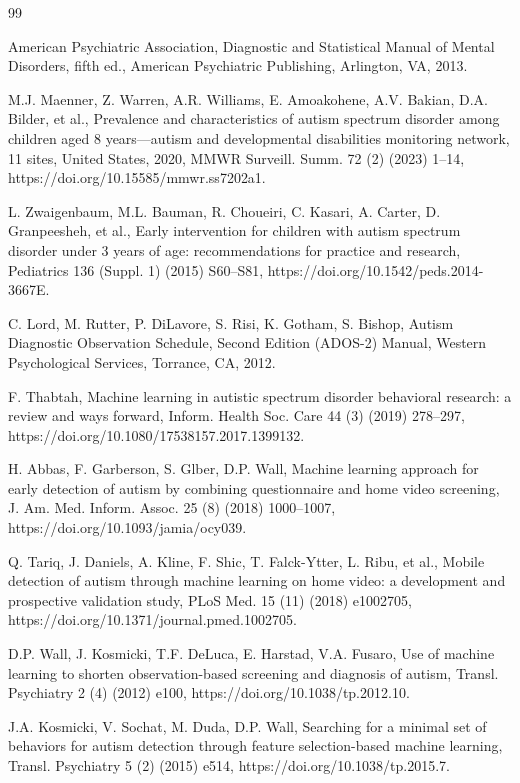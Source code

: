 \documentclass[pdflatex,sn-vancouver-num]{sn-jnl}
\begin{document}
\begin{thebibliography}{99}

American Psychiatric Association, Diagnostic and Statistical Manual of Mental Disorders, fifth ed., American Psychiatric Publishing, Arlington, VA, 2013.

M.J. Maenner, Z. Warren, A.R. Williams, E. Amoakohene, A.V. Bakian, D.A. Bilder, et al., Prevalence and characteristics of autism spectrum disorder among children aged 8 years---autism and developmental disabilities monitoring network, 11 sites, United States, 2020, MMWR Surveill. Summ. 72 (2) (2023) 1--14, https://doi.org/10.15585/mmwr.ss7202a1.

L. Zwaigenbaum, M.L. Bauman, R. Choueiri, C. Kasari, A. Carter, D. Granpeesheh, et al., Early intervention for children with autism spectrum disorder under 3 years of age: recommendations for practice and research, Pediatrics 136 (Suppl. 1) (2015) S60--S81, https://doi.org/10.1542/peds.2014-3667E.

C. Lord, M. Rutter, P. DiLavore, S. Risi, K. Gotham, S. Bishop, Autism Diagnostic Observation Schedule, Second Edition (ADOS-2) Manual, Western Psychological Services, Torrance, CA, 2012.

F. Thabtah, Machine learning in autistic spectrum disorder behavioral research: a review and ways forward, Inform. Health Soc. Care 44 (3) (2019) 278--297, https://doi.org/10.1080/17538157.2017.1399132.

H. Abbas, F. Garberson, S. Glber, D.P. Wall, Machine learning approach for early detection of autism by combining questionnaire and home video screening, J. Am. Med. Inform. Assoc. 25 (8) (2018) 1000--1007, https://doi.org/10.1093/jamia/ocy039.

Q. Tariq, J. Daniels, A. Kline, F. Shic, T. Falck-Ytter, L. Ribu, et al., Mobile detection of autism through machine learning on home video: a development and prospective validation study, PLoS Med. 15 (11) (2018) e1002705, https://doi.org/10.1371/journal.pmed.1002705.

D.P. Wall, J. Kosmicki, T.F. DeLuca, E. Harstad, V.A. Fusaro, Use of machine learning to shorten observation-based screening and diagnosis of autism, Transl. Psychiatry 2 (4) (2012) e100, https://doi.org/10.1038/tp.2012.10.

J.A. Kosmicki, V. Sochat, M. Duda, D.P. Wall, Searching for a minimal set of behaviors for autism detection through feature selection-based machine learning, Transl. Psychiatry 5 (2) (2015) e514, https://doi.org/10.1038/tp.2015.7.


\end{thebibliography}
\end{document}
